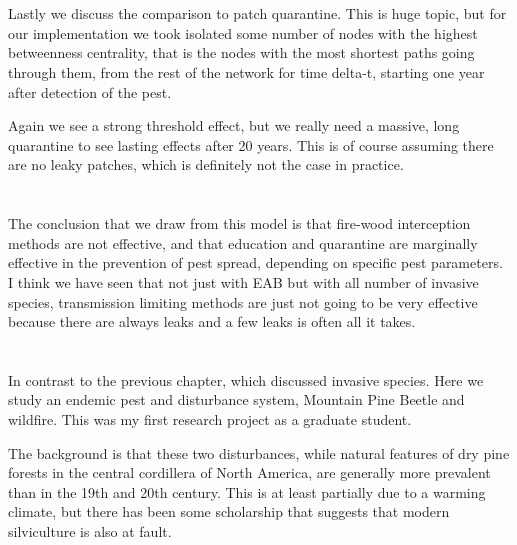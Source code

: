 \documentclass{article}
\begin{document}
\section{}

Lastly we discuss the comparison to patch quarantine. This is huge topic, but for our implementation we took isolated some number of nodes with the highest betweenness centrality, that is the nodes with the most shortest paths going through them, from the rest of the network for time delta-t, starting one year after detection of the pest.

Again we see a strong threshold effect, but we really need a massive, long quarantine to see lasting effects after 20 years. This is of course assuming there are no leaky patches, which is definitely not the case in practice.

\section{}

The conclusion that we draw from this model is that fire-wood interception methods are not effective, and that education and quarantine are marginally effective in the prevention of pest spread, depending on specific pest parameters. I think we have seen that not just with EAB but with all number of invasive species, transmission limiting methods are just not going to be very effective because there are always leaks and a few leaks is often all it takes. 

\section{}

In contrast to the previous chapter, which discussed invasive species. Here we study an endemic pest and disturbance system, Mountain Pine Beetle and wildfire. This was my first research project as a graduate student.

The background is that these two disturbances, while natural features of dry pine forests in the central cordillera of North America, are generally more prevalent than in the 19th and 20th century. This is at least partially due to a warming climate, but there has been some scholarship that suggests that modern silviculture is also at fault. 


\section{}
\end{document}
